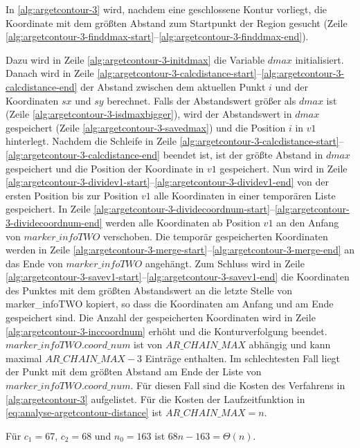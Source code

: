 In \autoref{alg:argetcontour-3} wird, nachdem eine geschlossene Kontur vorliegt, die Koordinate mit dem größten Abstand
 zum Startpunkt der Region gesucht (Zeile
 \ref{alg:argetcontour-3-finddmax-start}--\ref{alg:argetcontour-3-finddmax-end}).

Dazu wird in Zeile \ref{alg:argetcontour-3-initdmax} die Variable $\mathit{dmax}$ initialisiert. Danach wird in Zeile
 \ref{alg:argetcontour-3-calcdistance-start}--\ref{alg:argetcontour-3-calcdistance-end} der Abstand zwischen dem
 aktuellen Punkt $i$ und der Koordinaten $\mathit{sx}$ und $\mathit{sy}$ berechnet. Falls der Abstandswert größer als
 $\mathit{dmax}$ ist (Zeile \ref{alg:argetcontour-3-isdmaxbigger}), wird der Abstandswert in $\mathit{dmax}$
 gespeichert (Zeile \ref{alg:argetcontour-3-savedmax}) und die Position $i$ in $\mathit{v1}$ hinterlegt. Nachdem die
 Schleife in Zeile \ref{alg:argetcontour-3-calcdistance-start}--\ref{alg:argetcontour-3-calcdistance-end} beendet ist,
 ist der größte Abstand in $\mathit{dmax}$ gespeichert und die Position der Koordinate in $\mathit{v1}$ gespeichert.
 Nun wird in Zeile \ref{alg:argetcontour-3-dividev1-start}--\ref{alg:argetcontour-3-dividev1-end} von der ersten
 Position bis zur Position $\mathit{v1}$ alle Koordinaten in einer temporären Liste gespeichert. In Zeile
 \ref{alg:argetcontour-3-dividecoordnum-start}--\ref{alg:argetcontour-3-dividecoordnum-end} werden alle Koordinaten ab
 Position $\mathit{v1}$ an den Anfang von $\mathit{marker\_infoTWO}$ verschoben. Die temporär gespeicherten Koordinaten
 werden in Zeile \ref{alg:argetcontour-3-merge-start}--\ref{alg:argetcontour-3-merge-end} an das Ende von
 $\mathit{marker\_infoTWO}$ angehängt. Zum Schluss wird in Zeile
 \ref{alg:argetcontour-3-savev1-start}--\ref{alg:argetcontour-3-savev1-end} die Koordinaten des Punktes mit dem größten
 Abstandswert an die letzte Stelle von marker\_infoTWO kopiert, so dass die Koordinaten am Anfang und am Ende
 gespeichert sind. Die Anzahl der gespeicherten Koordinaten wird in Zeile \ref{alg:argetcontour-3-inccoordnum} erhöht
 und die Konturverfolgung beendet. $\mathit{marker\_infoTWO.coord\_num}$ ist von $\mathit{AR\_CHAIN\_MAX}$ abhängig und
 kann maximal $\mathit{AR\_CHAIN\_MAX} - 3$ Einträge enthalten. Im schlechtesten Fall liegt der Punkt mit dem größten
 Abstand am Ende der Liste von $\mathit{marker\_infoTWO.coord\_num}$. Für diesen Fall sind die Kosten des Verfahrens
 in \autoref{alg:argetcontour-3} aufgelistet. Für die Kosten der Laufzeitfunktion in
 \autoref{eq:analyse-argetcontour-distance} ist $\mathit{AR\_CHAIN\_MAX} = n$.

Für $c_{1} = 67$, $c_{2} = 68$ und $n_{0} = 163$ ist $68n - 163 = \Theta(n)$.

